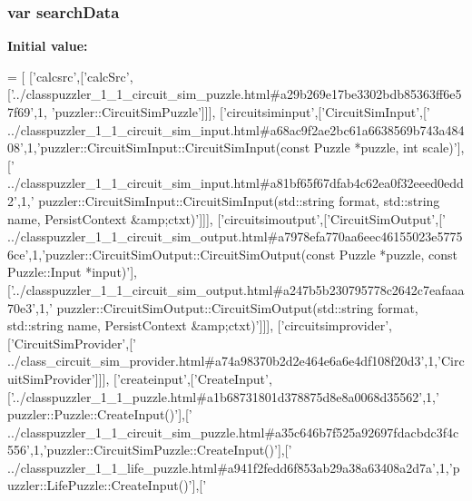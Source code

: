\subsubsection[{search\+Data}]{\setlength{\rightskip}{0pt plus 5cm}var search\+Data}\label{a00084_ad01a7523f103d6242ef9b0451861231e}
{\bfseries Initial value\+:}
\begin{DoxyCode}
=
[
  [\textcolor{stringliteral}{'calcsrc'},[\textcolor{stringliteral}{'calcSrc'},[\textcolor{stringliteral}{'../classpuzzler\_1\_1\_circuit\_sim\_puzzle.html#a29b269e17be3302bdb85363ff6e57f69'},1,\textcolor{stringliteral}{
      'puzzler::CircuitSimPuzzle'}]]],
  [\textcolor{stringliteral}{'circuitsiminput'},[\textcolor{stringliteral}{'CircuitSimInput'},[\textcolor{stringliteral}{'
      ../classpuzzler\_1\_1\_circuit\_sim\_input.html#a68ac9f2ae2bc61a6638569b743a48408'},1,\textcolor{stringliteral}{'puzzler::CircuitSimInput::CircuitSimInput(const Puzzle *puzzle, int scale)'}],[\textcolor{stringliteral}{'
      ../classpuzzler\_1\_1\_circuit\_sim\_input.html#a81bf65f67dfab4c62ea0f32eeed0edd2'},1,\textcolor{stringliteral}{'
      puzzler::CircuitSimInput::CircuitSimInput(std::string format, std::string name, PersistContext &amp;ctxt)'}]]],
  [\textcolor{stringliteral}{'circuitsimoutput'},[\textcolor{stringliteral}{'CircuitSimOutput'},[\textcolor{stringliteral}{'
      ../classpuzzler\_1\_1\_circuit\_sim\_output.html#a7978efa770aa6eec46155023e57756ce'},1,\textcolor{stringliteral}{'puzzler::CircuitSimOutput::CircuitSimOutput(const Puzzle *puzzle, const Puzzle::Input
       *input)'}],[\textcolor{stringliteral}{'../classpuzzler\_1\_1\_circuit\_sim\_output.html#a247b5b230795778c2642c7eafaaa70e3'},1,\textcolor{stringliteral}{'
      puzzler::CircuitSimOutput::CircuitSimOutput(std::string format, std::string name, PersistContext &amp;ctxt)'}]]],
  [\textcolor{stringliteral}{'circuitsimprovider'},[\textcolor{stringliteral}{'CircuitSimProvider'},[\textcolor{stringliteral}{'
      ../class\_circuit\_sim\_provider.html#a74a98370b2d2e464e6a6e4df108f20d3'},1,\textcolor{stringliteral}{'CircuitSimProvider'}]]],
  [\textcolor{stringliteral}{'createinput'},[\textcolor{stringliteral}{'CreateInput'},[\textcolor{stringliteral}{'../classpuzzler\_1\_1\_puzzle.html#a1b68731801d378875d8e8a0068d35562'},1,\textcolor{stringliteral}{'
      puzzler::Puzzle::CreateInput()'}],[\textcolor{stringliteral}{'
      ../classpuzzler\_1\_1\_circuit\_sim\_puzzle.html#a35c646b7f525a92697fdacbdc3f4c556'},1,\textcolor{stringliteral}{'puzzler::CircuitSimPuzzle::CreateInput()'}],[\textcolor{stringliteral}{'
      ../classpuzzler\_1\_1\_life\_puzzle.html#a941f2fedd6f853ab29a38a63408a2d7a'},1,\textcolor{stringliteral}{'puzzler::LifePuzzle::CreateInput()'}],[\textcolor{stringliteral}{'
}
\end{DoxyCode}
